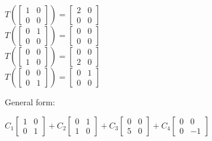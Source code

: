 	\begin{solution}
		\begin{center}
		    $T\left( \begin{bmatrix}1 & 0  \\ 0 & 0 \end{bmatrix} \right) = \begin{bmatrix}2 & 0  \\ 0 & 0 \end{bmatrix}$
		    \\
		    $T\left( \begin{bmatrix}0 & 1  \\ 0 & 0 \end{bmatrix} \right) = \begin{bmatrix}0 & 0  \\ 0 & 0 \end{bmatrix}$
		    \\
		    $T\left( \begin{bmatrix}0 & 0  \\ 1 & 0 \end{bmatrix} \right) = \begin{bmatrix}0 & 0  \\ 2 & 0 \end{bmatrix}$
		    \\
		    $T\left( \begin{bmatrix}0 & 0  \\ 0 & 1 \end{bmatrix} \right) = \begin{bmatrix}0 & 1  \\ 0 & 0 \end{bmatrix}$
		    \\
		    \end{center}
		    General form: \\
\begin{center}
		    $C_1\begin{bmatrix}1 & 0  \\ 0 & 1 \end{bmatrix} + C_2\begin{bmatrix}0 & 1  \\ 1 & 0 \end{bmatrix} +
		    C_3\begin{bmatrix}0 & 0  \\ 5 & 0 \end{bmatrix} + 
		    C_4\begin{bmatrix}0 & 0  \\ 0 & -1 \end{bmatrix}$

\end{center}
\end{solution}

